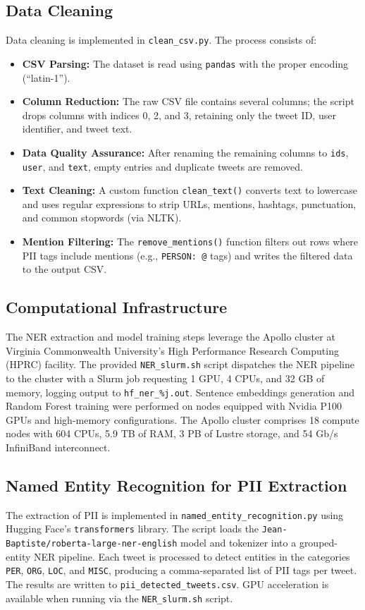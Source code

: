 \documentclass{article}
\begin{document}
\subsection{Data Cleaning}
Data cleaning is implemented in \texttt{clean\_csv.py}. The process consists of:
\begin{itemize}
    \item \textbf{CSV Parsing:} The dataset is read using \texttt{pandas} with the proper encoding (``latin-1'').
    \item \textbf{Column Reduction:} The raw CSV file contains several columns; the script drops columns with indices 0, 2, and 3, retaining only the tweet ID, user identifier, and tweet text.
    \item \textbf{Data Quality Assurance:} After renaming the remaining columns to \texttt{ids}, \texttt{user}, and \texttt{text}, empty entries and duplicate tweets are removed.
    \item \textbf{Text Cleaning:} A custom function \texttt{clean\_text()} converts text to lowercase and uses regular expressions to strip URLs, mentions, hashtags, punctuation, and common stopwords (via NLTK).
    \item \textbf{Mention Filtering:} The \texttt{remove\_mentions()} function filters out rows where PII tags include mentions (e.g., \texttt{PERSON: @} tags) and writes the filtered data to the output CSV.
\end{itemize}

\subsection{Computational Infrastructure}
The NER extraction and model training steps leverage the Apollo cluster at Virginia Commonwealth University’s High Performance Research Computing (HPRC) facility. The provided \texttt{NER\_slurm.sh} script dispatches the NER pipeline to the cluster with a Slurm job requesting 1 GPU, 4 CPUs, and 32 GB of memory, logging output to \texttt{hf\_ner\_\%j.out}. Sentence embeddings generation and Random Forest training were performed on nodes equipped with Nvidia P100 GPUs and high-memory configurations. The Apollo cluster comprises 18 compute nodes with 604 CPUs, 5.9 TB of RAM, 3 PB of Lustre storage, and 54 Gb/s InfiniBand interconnect.

\subsection{Named Entity Recognition for PII Extraction}
The extraction of PII is implemented in \texttt{named\_entity\_recognition.py} using Hugging Face’s \texttt{transformers} library. The script loads the \texttt{Jean-Baptiste/roberta-large-ner-english} model and tokenizer into a grouped-entity NER pipeline. Each tweet is processed to detect entities in the categories \texttt{PER}, \texttt{ORG}, \texttt{LOC}, and \texttt{MISC}, producing a comma-separated list of PII tags per tweet. The results are written to \texttt{pii\_detected\_tweets.csv}. GPU acceleration is available when running via the \texttt{NER\_slurm.sh} script.
\end{document}
